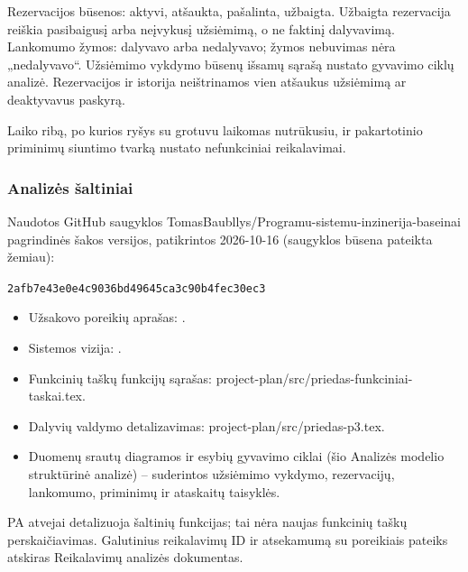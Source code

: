 Rezervacijos būsenos: aktyvi, atšaukta, pašalinta, užbaigta. Užbaigta rezervacija reiškia pasibaigusį arba neįvykusį užsiėmimą, o ne faktinį dalyvavimą. Lankomumo žymos: dalyvavo arba nedalyvavo; žymos nebuvimas nėra „nedalyvavo“. Užsiėmimo vykdymo būsenų išsamų sąrašą nustato gyvavimo ciklų analizė. Rezervacijos ir istorija neištrinamos vien atšaukus užsiėmimą ar deaktyvavus paskyrą.

Laiko ribą, po kurios ryšys su grotuvu laikomas nutrūkusiu, ir pakartotinio priminimų siuntimo tvarką nustato nefunkciniai reikalavimai.

\subsubsection{Analizės šaltiniai}
Naudotos GitHub saugyklos TomasBaubllys/Programu-sistemu-inzinerija-baseinai pagrindinės šakos versijos, patikrintos 2026-10-16 (saugyklos būsena pateikta žemiau):\par
{\footnotesize\texttt{2afb7e43e0e4c9036bd49645ca3c90b4fec30ec3}}
\begin{itemize}
\item Užsakovo poreikių aprašas: .
\item Sistemos vizija: .
\item Funkcinių taškų funkcijų sąrašas: project-plan/src/priedas-funkciniai-taskai.tex.
\item Dalyvių valdymo detalizavimas: project-plan/src/priedas-p3.tex.
\item Duomenų srautų diagramos ir esybių gyvavimo ciklai (šio Analizės modelio struktūrinė analizė) -- suderintos užsiėmimo vykdymo, rezervacijų, lankomumo, priminimų ir ataskaitų taisyklės.
\end{itemize}
PA atvejai detalizuoja šaltinių funkcijas; tai nėra naujas funkcinių taškų perskaičiavimas. Galutinius reikalavimų ID ir atsekamumą su poreikiais pateiks atskiras Reikalavimų analizės dokumentas.

